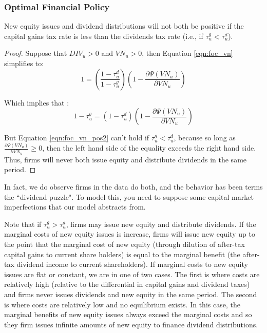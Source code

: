\subsubsection{Optimal Financial Policy}

\begin{proposition}
\label{prop:vn_div}
New equity issues and dividend distributions will not both be positive if the capital gains tax rate is less than the dividends tax rate (i.e., if $\tau^{g}_{u}<\tau^{d}_{u}$).
\end{proposition}

\begin{proof}
Suppose that $DIV_{u}>0$ and $VN_{u}>0$, then Equation \ref{eqn:foc_vn} simplifies to:
 \begin{equation}
\label{eqn:foc_vn_pos}
 1 = \left(\frac{1-\tau^{d}_{u}}{1-\tau^{g}_{u}}\right)\left(1-\frac{\partial \Psi(VN_{u})}{\partial VN_{u}}\right) 
 \end{equation}
 
Which implies that :
  \begin{equation}
  \label{eqn:foc_vn_pos2}
 1-\tau^{g}_{u} = (1-\tau^{d}_{u})\left(1-\frac{\partial \Psi(VN_{u})}{\partial VN_{u}}\right) 
 \end{equation}


But Equation \ref{eqn:foc_vn_pos2} can't hold if $\tau^{g}_{u}<\tau^{d}_{u}$, because so long as $\frac{\partial \Psi(VN_{u})}{\partial VN_{u}}\geq0$, then the left hand side of the equality exceeds the right hand side.  Thus, firms will never both issue equity and distribute dividends in the same period.
\end{proof}

In fact, we do observe firms in the data do both, and the behavior has been terms the ``dividend puzzle".  To model this, you need to suppose some capital market imperfections that our model abstracts from.  

Note that if $\tau^{g}_{u}>\tau^{d}_{u}$, firms may issue new equity and distribute dividends.  If the marginal costs of new equity issues is increase, firms will issue new equity up to the point that the marginal cost of new equity (through dilution of after-tax capital gains to current share holders) is equal to the marginal benefit (the after-tax dividend income to current shareholders).  If marginal costs to new equity issues are flat or constant, we are in one of two cases.  The first is where costs are relatively high (relative to the differential in capital gains and dividend taxes) and firms never issues dividends and new equity in the same period.  The second is where costs are relatively low and no equilibrium exists.  In this case, the marginal benefits of new equity issues always exceed the marginal costs and so they firm issues infinite amounts of new equity to finance dividend distributions.\\

